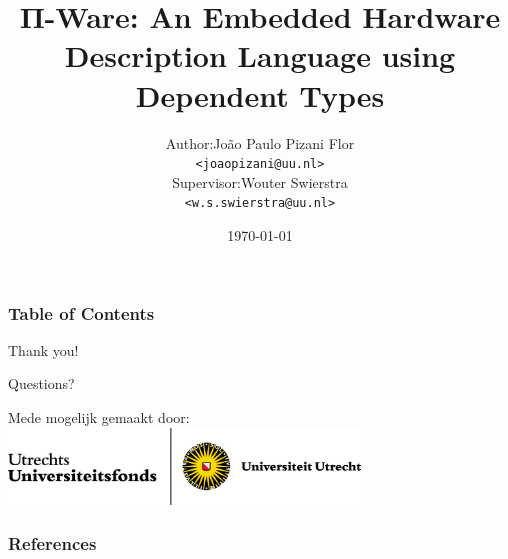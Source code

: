 \documentclass{beamer}
\title[PiWare]{Π-Ware: An Embedded Hardware Description Language using Dependent Types}
\date{\today}
\institute[Utrecht University] {
    Department of Information and Computing Sciences \\
    Utrecht University
}
\begin{document}
    \author[J. P. Pizani Flor]{
        \begin{tabular}{r@{ }l}
            Author:     & João Paulo Pizani Flor \\
                        & \small{\texttt{<joaopizani@uu.nl>}} \\[2ex]
            Supervisor: & Wouter Swierstra \\
                        & \small{\texttt{<w.s.swierstra@uu.nl>}}
        \end{tabular}
    }


    \begin{frame}
        \titlepage
    \end{frame}

    \begin{frame}
        \frametitle{Table of Contents}
        \tableofcontents
    \end{frame}


    
    
    
    
    
    


    \begin{frame}[plain]
        \begin{center}
            \par{\Huge{Thank you!}}
            \vspace{1.0cm}
            \par{\Huge{Questions?}}
        \end{center}
            \vfill
            Mede mogelijk gemaakt door:
            \includegraphics[width=0.7\textwidth]{imgs/uufonds.jpg}
    \end{frame}

    \begin{frame}[allowframebreaks]
        \frametitle{References}
        
        
    \end{frame}
\end{document}
